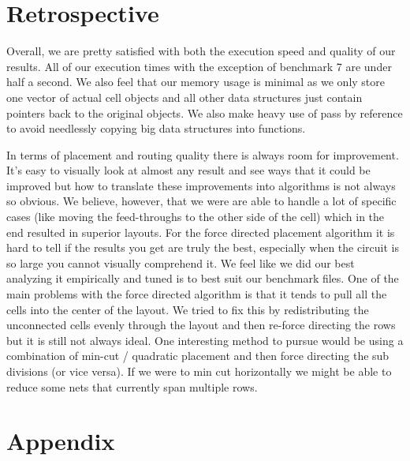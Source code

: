\documentclass[10pt]{article}
\begin{document}
\newpage
\section{Retrospective}

Overall, we are pretty satisfied with both the execution speed and quality of
our results. All of our execution times with the exception of benchmark 7 are
under half a second. We also feel that our memory usage is minimal as we only
store one vector of actual cell objects and all other data structures just
contain pointers back to the original objects. We also make heavy use of pass
by reference to avoid needlessly copying big data structures into functions.

In terms of placement and routing quality there is always room for improvement.
It's easy to visually look at almost any result and see ways that it could be
improved but how to translate these improvements into algorithms is not always
so obvious. We believe, however, that we were are able to handle a lot of
specific cases (like moving the feed-throughs to the other side of the cell)
which in the end resulted in superior layouts.  For the force directed
placement algorithm it is hard to tell if the results you get are truly the
best, especially when the circuit is so large you cannot visually comprehend
it. We feel like we did our best analyzing it empirically and tuned is to best
suit our benchmark files. One of the main problems with the force directed
algorithm is that it tends to pull all the cells into the center of the layout.
We tried to fix this by redistributing the unconnected cells evenly through the
layout and then re-force directing the rows but it is still not always ideal.
One interesting method to pursue would be using a combination of min-cut /
quadratic placement and then force directing the sub divisions (or vice versa).
If we were to min cut horizontally we might be able to reduce some nets that
currently span multiple rows.


\newpage
\section{Appendix}
\end{document}
